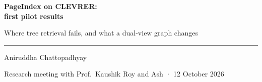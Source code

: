 \documentclass[aspectratio=169,11pt]{beamer}
\begin{document}
\begin{frame}[plain]
  \vspace{1.05cm}
  {\color{Ink}\fontsize{25}{30}\selectfont\bfseries
    PageIndex on CLEVRER:\\[0.05cm]
    first pilot results\par}
  \vspace{0.54cm}
  {\color{Body}\fontsize{13}{17}\selectfont
    Where tree retrieval fails, and what a dual-view graph changes\par}
  \vspace{0.90cm}
  {\color{Rule}\rule{0.42\textwidth}{0.5pt}\par}
  \vspace{0.36cm}
  {\color{Ink}\fontsize{12.5}{16}\selectfont Aniruddha Chattopadhyay\par}
  \vspace{0.12cm}
  {\color{Mute}\fontsize{10.5}{14}\selectfont Research meeting with Prof.\ Kaushik Roy and Ash \hspace{0.5em}·\hspace{0.5em} 12 October 2026\par}
\end{frame}
\end{document}
